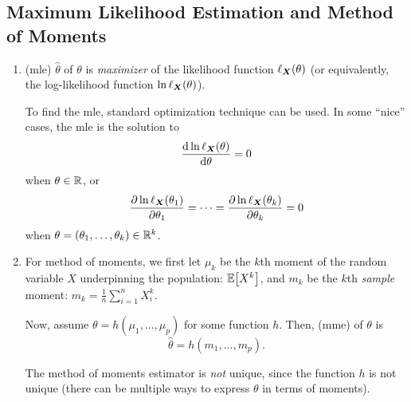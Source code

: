 \subsection{Maximum Likelihood Estimation and Method of Moments}
\begin{enumerate}
\item {} (mle) \(\widehat{\theta}\) of
\(\theta\) is \emph{maximizer} of the likelihood function
\(\ell_{\vb*{X}}\qty(\theta)\) (or equivalently, the log-likelihood function
\(\ln\ell_{\vb*{X}}\qty(\theta)\)).

\begin{note}
To find the mle, standard optimization technique can be used. In some ``nice''
cases, the mle is the solution to
\[
\dv{\ln\ell_{\vb*{X}}\qty(\theta)}{\theta}=0
\]
when \(\theta\in\mathbb{R}\), or 
\[
\pdv{\ln\ell_{\vb*{X}}\qty(\theta_1)}{\theta_1}=\dotsb=\pdv{\ln\ell_{\vb*{X}}\qty(\theta_k)}{\theta_k}=0
\]
when \(\theta=(\theta_1,\dotsc,\theta_k)\in\mathbb{R}^k\).
\end{note}
\item For method of moments, we first let \(\mu_k\) be the \(k\)th moment of
the random variable \(X\) underpinning the population: \(\mathbb{E}\qty[X^k]\), and
\(m_k\) be the \(k\)th \emph{sample} moment: \(m_k=\frac{1}{n}\sum_{i=1}^{n}X_i^{k}\).

Now, assume \(\theta=h(\mu_1,\dotsc,\mu_p)\) for some function \(h\). Then,
 (mme) of \(\theta\) is
\[
\widehat{\theta}=h(m_1,\dotsc,m_p).
\]
\begin{note}
The method of moments estimator is \emph{not} unique, since the function \(h\)
is not unique (there can be multiple ways to express \(\theta\) in terms of
moments).
\end{note}
\end{enumerate}
